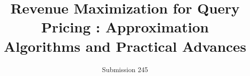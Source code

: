 \documentclass[format=acmsmall, review=false]{acmart}
\begin{document}
\title[Revenue Maximizing Algorithms for Query Pricing]{Revenue
  Maximization for Query Pricing : Approximation Algorithms and
  Practical Advances} 
\author{Submission 245}





\maketitle



%









\newpage
\appendix

\end{document}
